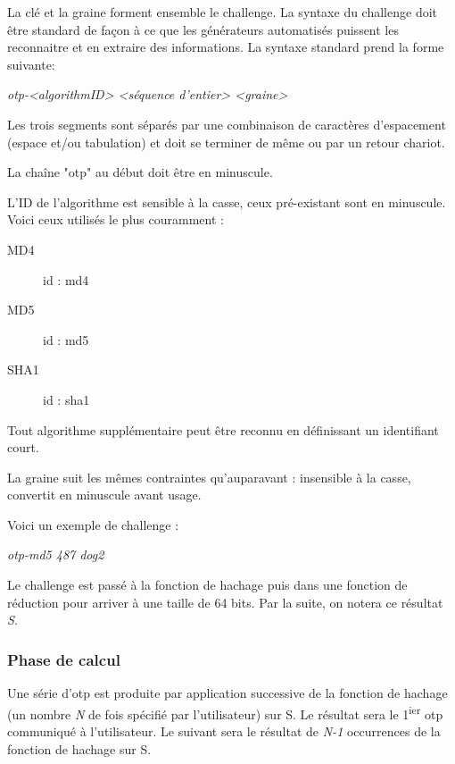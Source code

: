 \documentclass{../res/univ-projet}
\begin{document}
      La clé et la graine forment ensemble le challenge. La syntaxe du challenge
doit être standard de façon à ce que les générateurs automatisés puissent les 
reconnaitre et en extraire des informations. La syntaxe standard prend la forme 
suivante:
      \begin{center}
          \emph{otp-<algorithmID> <séquence d'entier> <graine>}\\
      \end{center}

      Les trois segments sont séparés par une combinaison de caractères 
d'espacement (espace et/ou tabulation) et doit se terminer de même ou par un 
retour chariot. 

      La chaîne "otp" au début doit être en minuscule.

      L'ID de l'algorithme est sensible à la casse, ceux pré-existant sont en 
      minuscule. Voici ceux utilisés le plus couramment :
      \begin{description}
          \item [MD4] id : md4
          \item [MD5] id : md5
          \item [SHA1] id : sha1 
      \end{description}
      Tout algorithme supplémentaire peut être reconnu en définissant un 
identifiant court.

      La graine suit les mêmes contraintes qu'auparavant : insensible à la 
    casse, convertit en minuscule avant usage.

      Voici un exemple de challenge :
      \begin{center}
          \emph{otp-md5 487 dog2 }\\ 
      \end{center}

      Le challenge est passé à la fonction de hachage puis dans une fonction
      de réduction pour arriver à une taille de 64 bits. Par la suite,
      on notera ce résultat \emph{S}.

    \subsubsection{Phase de calcul}
      Une série d'otp est produite par application successive de la fonction de 
hachage (un nombre \emph{N} de fois spécifié par l'utilisateur) sur S. Le 
résultat sera le 1\textsuperscript{ier} otp communiqué à l'utilisateur. Le 
suivant sera le résultat de \emph{N-1} occurrences de la fonction de hachage 
sur S. 
\end{document}
